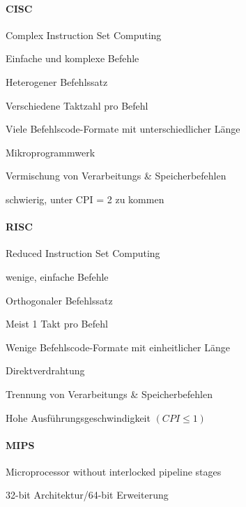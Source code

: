 \documentclass[10pt,landscape]{article}
\begin{document}
\raggedright
\footnotesize
\begin{multicols}{3}
  
  \setlength{\columnseprule}{0.25pt}
  \setlength{\premulticols}{1pt}
  \setlength{\postmulticols}{1pt}
  \setlength{\multicolsep}{1pt}
  \setlength{\columnsep}{2pt}
  
  \paragraph{CISC}
  \begin{itemize*}
    \item Complex Instruction Set Computing
    \item Einfache und komplexe Befehle
    \item Heterogener Befehlssatz
    \item Verschiedene Taktzahl pro Befehl
    \item Viele Befehlscode-Formate mit unterschiedlicher Länge
    \item Mikroprogrammwerk                             
    \item Vermischung von Verarbeitungs \& Speicherbefehlen
    \item schwierig, unter CPI = 2 zu kommen
  \end{itemize*}
  
  \paragraph{RISC}
  \begin{itemize*}
    \item Reduced Instruction Set Computing
    \item wenige, einfache Befehle
    \item Orthogonaler Befehlssatz   
    \item Meist 1 Takt pro Befehl
    \item Wenige Befehlscode-Formate mit einheitlicher Länge 
    \item Direktverdrahtung
    \item Trennung von Verarbeitungs \& Speicherbefehlen  
    \item Hohe Ausführungsgeschwindigkeit $(CPI \leq 1)$
  \end{itemize*}
  
  \paragraph{MIPS}
  \begin{itemize*}
    \item Microprocessor without interlocked pipeline stages
    \item 32-bit Architektur/64-bit Erweiterung
  \end{itemize*}
  

\end{multicols}
\end{document}
